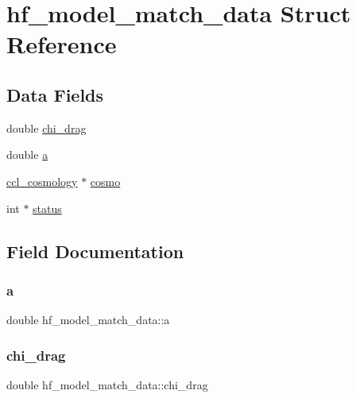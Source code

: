\hypertarget{structhf__model__match__data}{}\section{hf\+\_\+model\+\_\+match\+\_\+data Struct Reference}
\label{structhf__model__match__data}
\subsection*{Data Fields}
\begin{DoxyCompactItemize}
\item 
double \mbox{\hyperlink{structhf__model__match__data_af5bd043a2a12285adfed36e2940e8026}{chi\+\_\+drag}}
\item 
double \mbox{\hyperlink{structhf__model__match__data_a6e2a75be95742216b960653da32bb96f}{a}}
\item 
\mbox{\hyperlink{structccl__cosmology}{ccl\+\_\+cosmology}} $\ast$ \mbox{\hyperlink{structhf__model__match__data_a4f0bfbb99cb3055077baea7663bddda7}{cosmo}}
\item 
int $\ast$ \mbox{\hyperlink{structhf__model__match__data_ae30994cfc59a6a73875e67c51495adcd}{status}}
\end{DoxyCompactItemize}


\subsection{Field Documentation}
\mbox{\label{structhf__model__match__data_a6e2a75be95742216b960653da32bb96f}} 
\subsubsection{\texorpdfstring{a}{a}}
{\footnotesize\ttfamily double hf\+\_\+model\+\_\+match\+\_\+data\+::a}

\mbox{\label{structhf__model__match__data_af5bd043a2a12285adfed36e2940e8026}} 
\subsubsection{\texorpdfstring{chi\+\_\+drag}{chi\_drag}}
{\footnotesize\ttfamily double hf\+\_\+model\+\_\+match\+\_\+data\+::chi\+\_\+drag}

